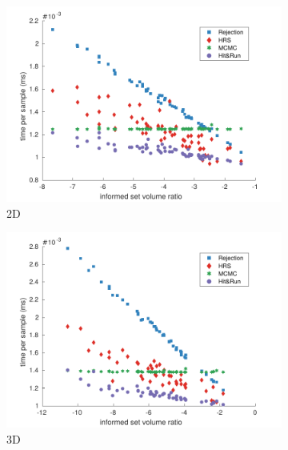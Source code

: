 \documentclass[letterpaper, 10 pt, conference]{ieeeconf}  %
\begin{document}
\begin{figure}[t!]
	\centering
	\begin{subfigure}[b]{0.5\textwidth}
		\includegraphics[width=\linewidth]{fig/sampling_efficiency/sample_efficiency_2d}
		\caption{2D}
		\label{fig:sampling_efficiency:2d}
	\end{subfigure}
	\begin{subfigure}[b]{0.5\textwidth}
		\includegraphics[width=\linewidth]{fig/sampling_efficiency/sample_efficiency_3d}
		\caption{3D}
		\label{fig:sampling_efficiency:4d}
	\end{subfigure}	
	\begin{subfigure}[b]{0.5\textwidth}

\end{subfigure}
\end{figure}
\end{document}
